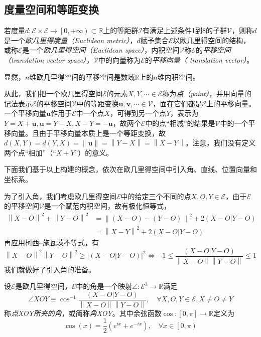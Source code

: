 \documentclass[main.tex]{subfiles}
\begin{document}
\subsection{度量空间和等距变换}
\begin{definition}[欧几里得空间]\label{def:II.3.5}
    若度量$d:\mathcal{E}\times\mathcal{E}\rightarrow\left[0,+\infty\right)\subset\mathbb{R}$上的等距群$\mathcal{I}$有满足上述条件1到8的子群$\mathcal{V}$，则称$d$是一个\emph{欧几里得度量（Euclidean metric）}，$d$赋予集合$\mathcal{E}$以欧几里得空间的结构，或称$\mathcal{E}$是一个\emph{欧几里得空间（Euclidean space）}，内积空间$\mathcal{V}$称$\mathcal{E}$的\emph{平移空间（translation vector space）}，$\mathcal{V}$中的向量称为$\mathcal{E}$的\emph{平移向量（ translation vector）}。
\end{definition}
显然，$n$维欧几里得空间的平移空间是数域$\mathbb{R}$上的$n$维内积空间。

从此，我们把一个欧几里得空间$\mathcal{E}$的元素$X,Y,\cdots\in\mathcal{E}$称为\emph{点（point）}，并用向量的记法表示$\mathcal{E}$的平移空间$\mathcal{V}$中的等距变换$\mathbf{u},\mathbf{v},\cdots\in\mathcal{V}$，面在它们都是$\mathcal{E}$上的平移向量。一个平移向量$\mathbf{u}$作用于$\mathcal{E}$中一个点$X$，可得到另一个点$Y$，表示为$Y=X+\mathbf{u},\mathbf{u}=Y-X,X-Y=-\mathbf{u}$，故两个$\mathcal{E}$中的点“相减”的结果是$\mathcal{V}$中的一个平移向量。且由于平移向量本质上是一个等距变换，故$d\left(X,Y\right)=d\left(Y,X\right)=\left\|\mathbf{u}\right\|=\left\|Y-X\right\|=\left\|X-Y\right\|$。注意，我们没有定义两个点“相加”（“$X+Y$”）的意义。

下面我们基于以上构建的概念，依次在欧几里得空间中引入角、直线、位置向量和坐标系。

为了引入角，我们考虑欧几里得空间$\mathcal{E}$中的给定三个不同的点$X,O,Y\in\mathcal{E}$，由于$\mathcal{E}$的平移空间$\mathcal{V}$是一个赋范内积空间，故有极化恒等式，
\begin{align*}
    \left\|X-O\right\|^2+\left\|Y-O\right\|^2 & =\left\|\left(X-O\right)-\left(Y-O\right)\right\|^2+2\left(X-O|Y-O\right) \\
                                              & =\left\|X-Y\right\|^2+2\left(X-O|Y-O\right)
\end{align*}
再应用柯西--施瓦茨不等式，有
\[\left\|X-O\right\|^2\left\|Y-O\right\|^2\geq\left|\left(X-O|Y-O\right)\right|^2\Leftrightarrow-1\leq\frac{\left(X-O|Y-O\right)}{\left\|X-O\right\|\left\|Y-O\right\|}\leq1\]
我们就做好了引入角的准备。

\begin{definition}[角]\label{def:II.3.6}
    设$\mathcal{E}$是欧几里得空间，$\mathcal{E}$中的角是一个映射$\angle:\mathcal{E}^3\rightarrow\mathbb{R}$满足
    \[\angle XOY\equiv\cos^{-1}\frac{\left(X-O|Y-O\right)}{\left\|X-O\right\|\left\|Y-O\right\|},\quad\forall X,O,Y\in\mathcal{E},X\neq O\neq Y\]
    称\emph{点XOY所夹的角}，或简称\emph{角XOY}。其中余弦函数$\cos:\left[0,\pi\right]\rightarrow\mathbb{R}$定义为
    \[\cos\left(x\right)=\frac{1}{2}\left(e^{ix}+e^{-ix}\right),\quad\forall x\in\left[0,\pi\right)\]
\end{definition}
\end{document}
